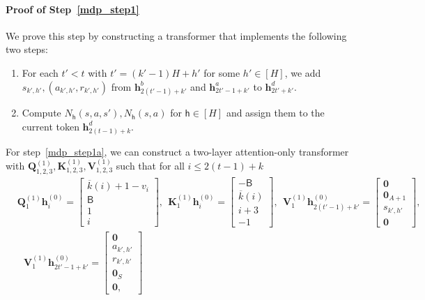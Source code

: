 \documentclass[10pt]{article}
\renewcommand{\bar}{\overline}
\newcommand{\<}{\left\langle}
\renewcommand{\>}{\right\rangle}
\renewcommand{\bQ}{\mathbf{Q}}
\newcommand{\bzero}{{\mathbf 0}}
\newcommand{\parta}{{a}}
\newcommand{\partb}{{b}}
\newcommand{\partd}{{d}}
\newcommand{\state}{{s}}
\newcommand{\action}{{a}}
\newcommand{\reward}{{r}}
\newcommand{\horizon}{{H}}
\renewcommand{\horizon}{{H}}
\newcommand{\tfthres}{{\mathsf{B}}}   %
\newcommand{\Numst}{{S}}
\newcommand{\Numact}{{A}}
\newcommand{\Numvi}{{N}}
\newcommand{\oddeven}{{v}}
\def\bK{{\mathbf K}}
\def\bQ{{\mathbf Q}}
\def\bV{{\mathbf V}}
\def\bh{{\mathbf h}}
\def\sh{{\mathsf{h}}}
\begin{document}
\paragraph{Proof of Step~\ref{mdp_step1}} We prove this step by constructing a transformer that implements the following two steps:
\begin{enumerate}[label= Step 1\alph*, ref= 1\alph*]
    \item\label{mdp_step1a} For each $t'< t$ with $t'=(k'-1)\horizon+h'$ for some $h'\in[\horizon]$, we add  $\state_{k',h'},(\action_{k',h'},\reward_{k',h'})$ from  $\bh^\partb_{2(t'-1)+k'}$ and $\bh^\parta_{2t'-1+k'}$  to  $\bh^\partd_{2t'+k'}$.
    \item\label{mdp_step1b} Compute $\Numvi_{\sh}(\state,\action,\state'),\Numvi_{\sh}(\state,\action)$ for $\sh\in[\horizon]$ and assign them to the current token $\bh^\partd_{2(t-1)+k}$.
\end{enumerate}
For step~\ref{mdp_step1a}, we can construct a two-layer attention-only transformer with $\bQ^{(1)}_{1,2,3},\bK^{(1)}_{1,2,3},\bV^{(1)}_{1,2,3}$ such that for all $i\leq 2(t-1)+k$
\begin{align*}
&\bQ^{(1)}_{1}\bh^{(0)}_{i}=
\begin{bmatrix}
        \bar{k}(i)+1-\oddeven_{i}\\
        \tfthres\\
        1\\
       i
    \end{bmatrix},~~ \bK^{(1)}_{1}\bh^{(0)}_{i}=\begin{bmatrix}
        -\tfthres\\\bar{k}(i)\\ i+3\\-1
\end{bmatrix},~~ \bV^{(1)}_{1}\bh^{(0)}_{2(t'-1)+k'}=
\begin{bmatrix}
\bzero\\\bzero_{\Numact+1}\\\state_{k',h'}\\\bzero\end{bmatrix},\\
&~~~
\bV^{(1)}_{1}\bh^{(0)}_{2t'-1+k'}=
\begin{bmatrix}
\bzero\\\action_{k',h'}\\
\reward_{k',h'}
\\\bzero_\Numst\\\bzero,\end{bmatrix}
\end{align*}
\end{document}
